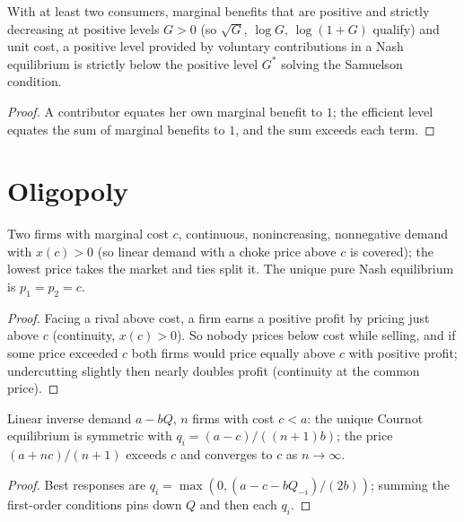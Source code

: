 \begin{theorem}
\label{thm:voluntary}
\leanok
{}
With at least two consumers, marginal benefits that are positive and strictly decreasing at positive levels
$G > 0$ (so $\sqrt G$, $\log G$, $\log(1+G)$ qualify) and unit cost, a positive level provided by voluntary
contributions in a Nash equilibrium is strictly below the positive level $G^*$ solving the Samuelson condition.
\end{theorem}
\begin{proof}
\leanok
A contributor equates her own marginal benefit to $1$; the efficient level equates the sum of marginal benefits
to $1$, and the sum exceeds each term.
\end{proof}

\section{Oligopoly}

\begin{theorem}
\label{thm:bertrand}
\leanok
Two firms with marginal cost $c$, continuous, nonincreasing, nonnegative demand with $x(c) > 0$ (so linear demand
with a choke price above $c$ is covered); the lowest price takes the market and ties split it. The unique pure Nash
equilibrium is $p_1 = p_2 = c$.
\end{theorem}
\begin{proof}
\leanok
Facing a rival above cost, a firm earns a positive profit by pricing just above $c$ (continuity, $x(c) > 0$). So
nobody prices below cost while selling, and if some price exceeded $c$ both firms would price equally above $c$ with
positive profit; undercutting slightly then nearly doubles profit (continuity at the common price).
\end{proof}

\begin{theorem}
\label{thm:cournot}
\leanok
Linear inverse demand $a - bQ$, $n$ firms with cost $c < a$: the unique Cournot equilibrium is symmetric with
$q_i = (a-c)/((n+1)b)$; the price $(a + nc)/(n+1)$ exceeds $c$ and converges to $c$ as $n \to \infty$.
\end{theorem}
\begin{proof}
\leanok
Best responses are $q_i = \max(0, (a - c - b Q_{-i})/(2b))$; summing the first-order conditions pins down $Q$ and
then each $q_i$.
\end{proof}

